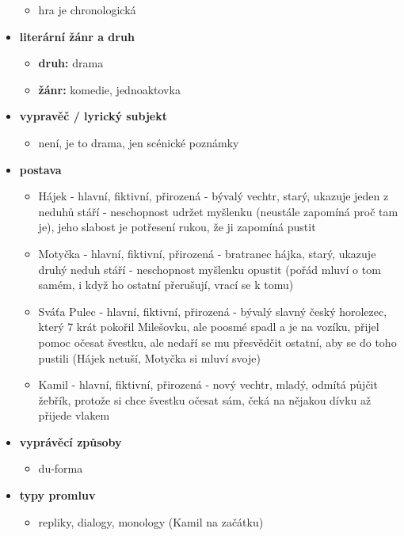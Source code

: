 \documentclass[11pt]{article}
\begin{document}
\begin{itemize}
\begin{itemize}
            \item hra je chronologická
        \end{itemize}
        \item\textbf{literární žánr a druh}
        \begin{itemize}
            \item\textbf{druh: }drama
            \item\textbf{žánr: }komedie, jednoaktovka
        \end{itemize}
        \item\textbf{vypravěč / lyrický subjekt}
        \begin{itemize}
            \item není, je to drama, jen scénické poznámky
        \end{itemize}
        \item\textbf{postava}
        \begin{itemize}
            \item Hájek - hlavní, fiktivní, přirozená - bývalý vechtr, starý, ukazuje jeden z neduhů stáří - neschopnost udržet myšlenku (neustále zapomíná proč tam je), jeho slabost je potřesení rukou, že ji zapomíná pustit
            \item Motyčka - hlavní, fiktivní, přirozená - bratranec hájka, starý, ukazuje druhý neduh stáří - neschopnost myšlenku opustit (pořád mluví o tom samém, i když ho ostatní přerušují, vrací se k tomu)
            \item Sváťa Pulec - hlavní, fiktivní, přirozená - bývalý slavný český horolezec, který 7 krát pokořil Milešovku, ale poosmé spadl a je na vozíku, přijel pomoc očesat švestku, ale nedaří se mu přesvědčit ostatní, aby se do toho pustili (Hájek netuší, Motyčka si mluví svoje)
            \item Kamil - hlavní, fiktivní, přirozená - nový vechtr, mladý, odmítá půjčit žebřík, protože si chce švestku očesat sám, čeká na nějakou dívku až přijede vlakem
        \end{itemize}
        \item\textbf{vyprávěcí způsoby}
        \begin{itemize}
            \item du-forma
        \end{itemize}
        \item\textbf{typy promluv}
        \begin{itemize}
            \item repliky, dialogy, monology (Kamil na začátku)

\end{itemize}
\end{itemize}
\end{document}
